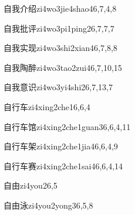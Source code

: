 \begin{verbete}{自我介绍}{zi4wo3jie4shao4}{6,7,4,8}
\end{verbete}

\begin{verbete}{自我批评}{zi4wo3pi1ping2}{6,7,7,7}
\end{verbete}

\begin{verbete}{自我实现}{zi4wo3shi2xian4}{6,7,8,8}
\end{verbete}

\begin{verbete}{自我陶醉}{zi4wo3tao2zui4}{6,7,10,15}
\end{verbete}

\begin{verbete}{自我意识}{zi4wo3yi4shi2}{6,7,13,7}
\end{verbete}

\begin{verbete}{自行车}{zi4xing2che1}{6,6,4}
\end{verbete}

\begin{verbete}{自行车馆}{zi4xing2che1guan3}{6,6,4,11}
\end{verbete}

\begin{verbete}{自行车架}{zi4xing2che1jia4}{6,6,4,9}
\end{verbete}

\begin{verbete}{自行车赛}{zi4xing2che1sai4}{6,6,4,14}
\end{verbete}

\begin{verbete}{自由}{zi4you2}{6,5}
\end{verbete}

\begin{verbete}{自由泳}{zi4you2yong3}{6,5,8}
\end{verbete}


